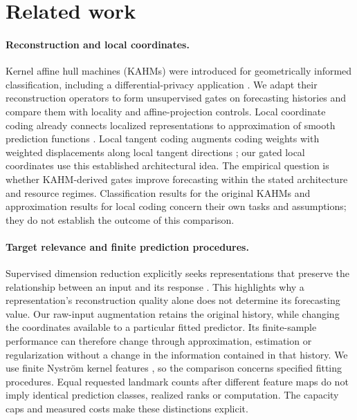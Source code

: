 \section{Related work}
\label{sec:related}

\paragraph{Reconstruction and local coordinates.}
Kernel affine hull machines (KAHMs) were introduced for geometrically informed
classification, including a differential-privacy application
\citep{Kumar2024KAHM}. We adapt their reconstruction operators to form
unsupervised gates on forecasting histories and compare them with locality
and affine-projection controls. Local coordinate coding already connects
localized representations to approximation of smooth prediction functions
\citep{Yu2009LCC}. Local tangent coding augments coding weights with weighted
displacements along local tangent directions \citep{YuZhang2010LTC}; our gated
local coordinates use this established architectural idea. The empirical
question is whether KAHM-derived gates improve forecasting within the stated
architecture and resource regimes. Classification results for the original
KAHMs and approximation results for local coding concern their own tasks
and assumptions; they do not establish the outcome of this comparison.

\paragraph{Target relevance and finite prediction procedures.}
Supervised dimension reduction explicitly seeks representations that preserve
the relationship between an input and its response \citep{Fukumizu2004SDR}.
This highlights why a representation's reconstruction quality alone does
not determine its forecasting value. Our raw-input augmentation retains the
original history, while changing the coordinates available to a particular
fitted predictor. Its finite-sample performance can therefore change through
approximation, estimation or regularization without a change in the
information contained in that history. We use finite Nystr\"om kernel
features \citep{Williams2001Nystrom}, so the comparison concerns specified
fitting procedures. Equal requested landmark counts after different feature
maps do not imply identical prediction classes, realized ranks or computation.
The capacity caps and measured costs make these distinctions explicit.

